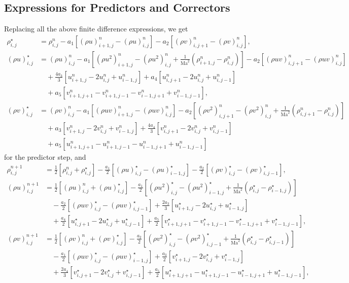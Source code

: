 \documentclass[11pt]{article}
\newcommand{\Ma}{\text{Ma}}
\newcommand{\ind}[4]{{#1}^{#2}_{#3,#4}}
\newcommand{\fDx}[4]{\ind{#1}{#2}{#3+1}{#4} - \ind{#1}{#2}{#3}{#4}}
\newcommand{\bDx}[4]{\ind{#1}{#2}{#3}{#4} - \ind{#1}{#2}{#3-1}{#4}}
\newcommand{\fDy}[4]{\ind{#1}{#2}{#3}{#4+1} - \ind{#1}{#2}{#3}{#4}}
\newcommand{\bDy}[4]{\ind{#1}{#2}{#3}{#4} - \ind{#1}{#2}{#3}{#4-1}}
\newcommand{\cDxx}[4]{\ind{#1}{#2}{#3+1}{#4} - 2\ind{#1}{#2}{#3}{#4} + \ind{#1}{#2}{#3-1}{#4}}
\newcommand{\cDyy}[4]{\ind{#1}{#2}{#3}{#4+1} - 2\ind{#1}{#2}{#3}{#4} + \ind{#1}{#2}{#3}{#4-1}}
\newcommand{\cDxy}[4]{\ind{#1}{#2}{#3+1}{#4+1} - \ind{#1}{#2}{#3+1}{#4-1} - \ind{#1}{#2}{#3-1}{#4+1} + \ind{#1}{#2}{#3-1}{#4-1}}
\begin{document}
\subsection{Expressions for Predictors and Correctors}

Replacing all the above finite difference expressions, we get
\begin{align}
\ind{\rho}{\star}{i}{j} &= \ind{\rho}{n}{i}{j} - a_1\left[ \fDx{(\rho u)}{n}{i}{j}\right] - a_2\left[ \fDy{(\rho v)}{n}{i}{j}\right],\\
\ind{(\rho u)}{\star}{i}{j} &= \ind{(\rho u)}{n}{i}{j} - a_1\left[ \fDx{(\rho u^2)}{n}{i}{j} + \frac{1}{\Ma^2}\left(\fDx{\rho}{n}{i}{j}\right) \right] - a_2\left[ \fDy{(\rho u v)}{n}{i}{j} \right]\\
&\quad + \frac{4a_3}{3}\left[ \cDxx{u}{n}{i}{j} \right] + a_4\left[ \cDyy{u}{n}{i}{j} \right]\\
&\quad + a_5\left[ \cDxy{v}{n}{i}{j} \right],\\
\ind{(\rho v)}{\star}{i}{j} &= \ind{(\rho v)}{n}{i}{j} - a_1\left[ \fDx{(\rho u v)}{n}{i}{j} \right]- a_2\left[ \fDy{(\rho v^2)}{n}{i}{j} + \frac{1}{\Ma^2}\left(\fDy{\rho}{n}{i}{j}\right) \right]\\
&\quad + a_3\left[ \cDxx{v}{n}{i}{j} \right] + \frac{4a_4}{3}\left[ \cDyy{v}{n}{i}{j} \right]\\
&\quad + a_5\left[ \cDxy{u}{n}{i}{j} \right]
\end{align}
for the predictor step, and
\begin{align}
\ind{\rho}{n+1}{i}{j} &= \frac{1}{2}\left[ \ind{\rho}{n}{i}{j} + \ind{\rho}{\star}{i}{j}\right] - \frac{a_1}{2}\left[ \bDx{(\rho u)}{\star}{i}{j}\right] - \frac{a_2}{2}\left[ \bDy{(\rho v)}{\star}{i}{j}\right],\\
\ind{(\rho u)}{n+1}{i}{j} &= \frac{1}{2}\left[ \ind{(\rho u)}{n}{i}{j} + \ind{(\rho u)}{\star}{i}{j} \right] - \frac{a_1}{2}\left[ \bDx{(\rho u^2)}{\star}{i}{j} + \frac{1}{\Ma^2}\left(\bDx{\rho}{\star}{i}{j}\right) \right]\\
&\quad - \frac{a_2}{2}\left[ \bDy{(\rho u v)}{\star}{i}{j} \right] + \frac{2a_3}{3}\left[ \cDxx{u}{\star}{i}{j} \right]\\
&\quad + \frac{a_4}{2}\left[ \cDyy{u}{\star}{i}{j} \right] + \frac{a_5}{2}\left[ \cDxy{v}{\star}{i}{j} \right],\\
\ind{(\rho v)}{n+1}{i}{j} &= \frac{1}{2}\left[ \ind{(\rho v)}{n}{i}{j} + \ind{(\rho v)}{\star}{i}{j} \right] - \frac{a_2}{2}\left[ \bDy{(\rho v^2)}{\star}{i}{j} + \frac{1}{\Ma^2}\left(\bDy{\rho}{\star}{i}{j}\right) \right]\\
&\quad - \frac{a_1}{2}\left[\bDx{(\rho u v)}{\star}{i}{j}\right] + \frac{a_3}{2}\left[ \cDxx{v}{\star}{i}{j} \right]\\
&\quad + \frac{2a_4}{3}\left[ \cDyy{v}{\star}{i}{j} \right] + \frac{a_5}{2}\left[ \cDxy{u}{\star}{i}{j} \right],
\end{align}
\end{document}
